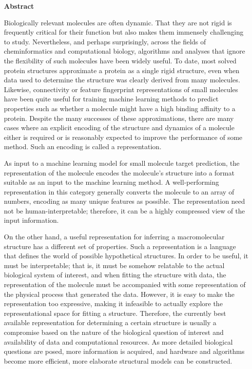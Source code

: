 \clearpage

\begin{center}
	\makeatletter
	{\Large \textbf{\@title}}

	\@author

	\makeatother

	\vspace{1cm}
	\textbf{Abstract}
\end{center}

Biologically relevant molecules are often dynamic.
That they are not rigid is frequently critical for their function but also makes them immensely challenging to study.
Nevertheless, and perhaps surprisingly, across the fields of cheminformatics and computational biology, algorithms and analyses that ignore the flexibility of such molecules have been widely useful.
To date, most solved protein structures approximate a protein as a single rigid structure, even when data used to determine the structure was clearly derived from many molecules.
Likewise, connectivity or feature fingerprint representations of small molecules have been quite useful for training machine learning methods to predict properties such as whether a molecule might have a high binding affinity to a protein.
Despite the many successes of these approximations, there are many cases where an explicit encoding of the structure and dynamics of a molecule either is required or is reasonably expected to improve the performance of some method.
Such an encoding is called a representation.

As input to a machine learning model for small molecule target prediction, the representation of the molecule encodes the molecule's structure into a format suitable as an input to the machine learning method.
A well-performing representation in this category generally converts the molecule to an array of numbers, encoding as many unique features as possible.
The representation need not be human-interpretable; therefore, it can be a highly compressed view of the input information.

On the other hand, a useful representation for inferring a macromolecular structure has a different set of properties.
Such a representation is a language that defines the world of possible hypothetical structures.
In order to be useful, it must be interpretable; that is, it must be somehow relatable to the actual biological system of interest, and when fitting the structure with data, the representation of the molecule must be accompanied with some representation of the physical process that generated the data.
However, it is easy to make the representation too expressive, making it infeasible to actually explore the representational space for fitting a structure.
Therefore, the currently best available representation for determining a certain structure is usually a compromise based on the nature of the biological question of interest and availability of data and computational resources.
As more detailed biological questions are posed, more information is acquired, and hardware and algorithms become more efficient, more elaborate structural models can be constructed.

